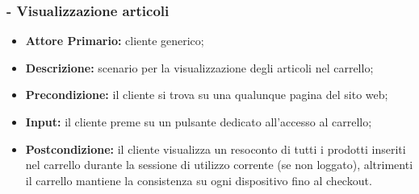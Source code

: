 \stepsubUserCase
\subsubsection{ - Visualizzazione articoli}
\begin{itemize}
    \item \textbf{Attore Primario:} cliente generico;
    \item \textbf{Descrizione:} scenario per la visualizzazione degli articoli nel carrello;
    \item \textbf{Precondizione:} il cliente si trova su una qualunque pagina del sito web;
    \item \textbf{Input:} il cliente preme su un pulsante dedicato all'accesso al carrello;
    \item \textbf{Postcondizione:} il cliente visualizza un resoconto di tutti i prodotti inseriti nel carrello durante
                                   la sessione di utilizzo corrente (se non loggato), altrimenti il carrello mantiene la consistenza
                                   su ogni dispositivo fino al checkout.
\end{itemize}

\stepsubUserCase
